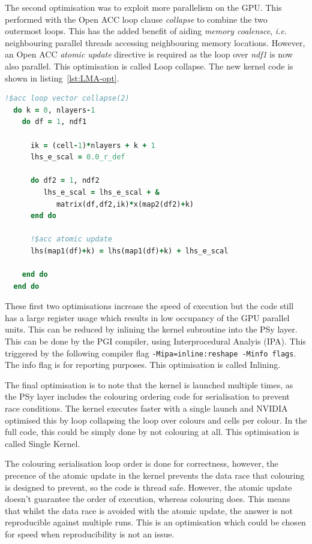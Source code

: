 The second optimisation was to exploit more parallelism on the GPU.
This performed with the Open ACC loop clause {\em collapse} to combine
the two outermost loops. This has the added benefit of aiding {\em
  memory coalensce}, {\em i.e.} neighbouring parallel threads
accessing neighbouring memory locations. However, an Open ACC {\em
  atomic update} directive is required as the loop over {\em ndf1} is
now also parallel. This optimisation is called Loop collapse. The new
kernel code is shown in listing~\ref{lst:LMA-opt}. 

\begin{lstlisting}[language=Fortran,caption={Optimised
    kernel},label={lst:LMA-opt}]
  !$acc loop vector collapse(2)
  do k = 0, nlayers-1
    do df = 1, ndf1

      ik = (cell-1)*nlayers + k + 1
      lhs_e_scal = 0.0_r_def

      do df2 = 1, ndf2
         lhs_e_scal = lhs_e_scal + & 
            matrix(df,df2,ik)*x(map2(df2)+k)
      end do
      
      !$acc atomic update
      lhs(map1(df)+k) = lhs(map1(df)+k) + lhs_e_scal

    end do
  end do
\end{lstlisting}

These first two optimisations increase the speed of execution but the
code still has a large register usage which results in low occupancy
of the GPU parallel units. This can be reduced by inlining the kernel
subroutine into the PSy layer. This can be done by the PGI compiler,
using Interprocedural Analyis (IPA). This triggered by the following
compiler flag \verb+-Mipa=inline:reshape -Minfo flags+. The info flag
is for reporting purposes. This optimisation is called Inlining. 

The final optimisation is to note that the kernel is launched multiple
times, as the PSy layer includes the colouring ordering code for serialisation
to prevent race conditions. The kernel executes faster with a
single launch and NVIDIA optimised this by loop collapsing the loop
over colours and cells per colour. In the full code, this could be
simply done by not colouring at all. This optimisation is called
Single Kernel.

The colouring serialisation loop order is done for correctness,
however, the precence of the atomic update in the kernel prevents the
data race that colouring is designed to prevent, so the code is thread
safe. However, the atomic update doesn't guarantee the order of
execution, whereas colouring does. This means that whilst the data
race is avoided with the atomic update, the answer is not reproducible against
multiple runs. This is an optimisation which could be chosen for speed
when reproducibility is not an issue.

